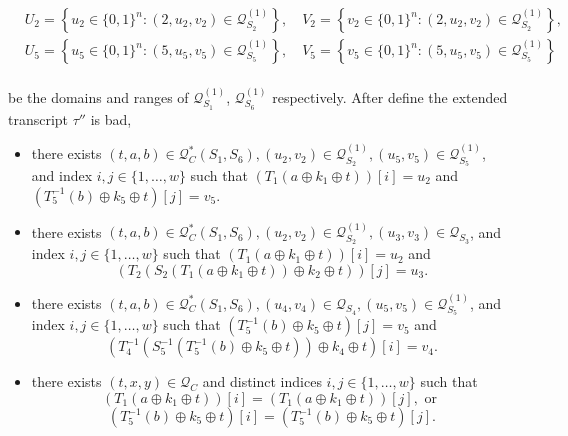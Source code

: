 $$
\begin{aligned}
&U_{2}=\left\{u_{2} \in\{0,1\}^{n}:\left(2, u_{2}, v_{2}\right) \in \mathcal{Q}_{S_{2}}^{(1)}\right\}, \quad V_{2}=\left\{v_{2} \in\{0,1\}^{n}:\left(2, u_{2}, v_{2}\right) \in \mathcal{Q}_{S_{2}}^{(1)}\right\},\\
&U_{5}=\left\{u_{5} \in\{0,1\}^{n}:\left(5, u_{5}, v_{5}\right) \in \mathcal{Q}_{S_{5}}^{(1)}\right\}, \quad V_{5}=\left\{v_{5} \in\{0,1\}^{n}:\left(5, u_{5}, v_{5}\right) \in \mathcal{Q}_{S_{5}}^{(1)}\right\}\\
\end{aligned}
$$

\noindent be the domains and ranges of $\mathcal{Q}_{S_{1}}^{(1)}$, $\mathcal{Q}_{S_{6}}^{(1)}$ respectively. After define the extended transcript $\tau''$ is bad, \\

\begin{itemize}
  \item[\feai]
  there exists $(t, a, b) \in \mathcal{Q}_{C}^{*}\left(S_{1}, S_{6}\right), \left(u_{2}, v_{2}\right) \in \mathcal{Q}_{S_{2}}^{(1)}, \left(u_{5}, v_{5}\right) \in \mathcal{Q}_{S_{5}}^{(1)}$, and index $i, j \in \{1, \ldots, w\}$ such that $(T_1\left(a \oplus k_{1} \oplus t\right))[i]=u_2$ and $(T_5^{-1}\left(b\right) \oplus k_{5} \oplus t)[j]=v_5$.
  \item[\feaii]
  there exists $(t, a, b) \in \mathcal{Q}_{C}^{*}\left(S_{1}, S_{6}\right), \left(u_{2}, v_{2}\right) \in \mathcal{Q}_{S_{2}}^{(1)}, \left(u_{3}, v_{3}\right) \in \mathcal{Q}_{S_{3}}$, and index $i, j \in \{1, \ldots, w\}$ such that $(T_1\left(a \oplus k_{1} \oplus t\right))[i]=u_2$ and 
  $$
  \left(T_{2}\left(S_{2}\left(T_1(a \oplus k_{1} \oplus t)\right) \oplus k_{2} \oplus t\right)\right)[j]=u_3.
  $$
  \item[\feaiii]
  there exists $(t, a, b) \in \mathcal{Q}_{C}^{*}\left(S_{1}, S_{6}\right), \left(u_{4}, v_{4}\right) \in \mathcal{Q}_{S_{4}}, \left(u_{5}, v_{5}\right) \in \mathcal{Q}_{S_{5}}^{(1)}$, and index $i, j \in \{1, \ldots, w\}$ such that $(T_5^{-1}\left(b\right) \oplus k_{5} \oplus t)[j]=v_5$ and 
  $$
  \left(T_{4}^{-1}\left(S_{5}^{-1}\left(T_5^{-1}(b) \oplus k_{5} \oplus t\right)\right) \oplus k_{4} \oplus t\right)[i]=v_4.
  $$
  \item[\feaiv]
  there exists $(t, x, y) \in \mathcal{Q}_{C}$ and distinct indices $i, j \in \{1, \ldots, w\}$ such that 
  $$(T_1\left(a \oplus k_{1} \oplus t\right))[i]=(T_1\left(a \oplus k_{1} \oplus t\right))[j], \text{ or }$$
  $$(T_5^{-1}\left(b\right) \oplus k_{5} \oplus t)[i]=(T_5^{-1}\left(b\right) \oplus k_{5} \oplus t)[j].$$
\end{itemize}

